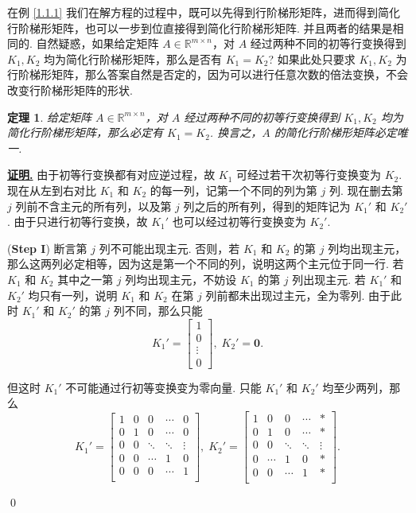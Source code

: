 \documentclass[10pt,openany]{article}
\theoremstyle{thmstyle} %
\newtheorem{theorem}{定理}[subsection]
\theoremstyle{defstyle} %
\theoremstyle{prostyle} %
\renewenvironment{proof}[1][证明]{\par\underline{\textbf{#1.}} \;\fangsong}{\qed\par}
\begin{document}
在例 \ref{1.1.1} 我们在解方程的过程中，既可以先得到行阶梯形矩阵，进而得到简化行阶梯形矩阵，也可以一步到位直接得到简化行阶梯形矩阵. 并且两者的结果是相同的. 自然疑惑，如果给定矩阵 \( A \in \mathbb{R}^{m \times n} \)，对 \( A \) 经过两种不同的初等行变换得到 \( K_1, K_2 \) 均为简化行阶梯形矩阵，那么是否有 \( K_1 = K_2 \)? 如果此处只要求 \( K_1, K_2 \) 为行阶梯形矩阵，那么答案自然是否定的，因为可以进行任意次数的倍法变换，不会改变行阶梯形矩阵的形状. 

\begin{theorem}
	给定矩阵 \( A \in \mathbb{R}^{m \times n} \)，对 \( A \) 经过两种不同的初等行变换得到 \( K_1, K_2 \) 均为简化行阶梯形矩阵，那么必定有 \( K_1=K_2 \). 换言之，\( A \) 的简化行阶梯形矩阵必定唯一. 
	\label{1.1.9}
\end{theorem}

\begin{proof}
	由于初等行变换都有对应逆过程，故 \( K_1 \) 可经过若干次初等行变换变为 \( K_2 \). 现在从左到右对比 \( K_1 \) 和 \( K_2 \) 的每一列，记第一个不同的列为第 \( j \) 列. 现在删去第 \( j \) 列前不含主元的所有列，以及第 \( j \) 列之后的所有列，得到的矩阵记为 \( K_1' \) 和 \( K_2' \). 由于只进行初等行变换，故 \( K_1' \) 也可以经过初等行变换变为 \( K_2' \).
	
	(\textbf{Step I}) 断言第 \( j \) 列不可能出现主元. 否则，若 \( K_1 \) 和 \( K_2 \) 的第 \( j \) 列均出现主元，那么这两列必定相等，因为这是第一个不同的列，说明这两个主元位于同一行. 若 \( K_1 \) 和 \( K_2 \) 其中之一第 \( j \) 列均出现主元，不妨设 \( K_1 \) 的第 \( j \) 列出现主元. 若 \( K_1' \) 和 \( K_2' \) 均只有一列，说明 \( K_1 \) 和 \( K_2 \) 在第 \( j \) 列前都未出现过主元，全为零列. 由于此时 \( K_1' \) 和 \( K_2' \) 的第 \( j \) 列不同，那么只能
	\[ K_1'= \begin{bmatrix}
		1 \\ 0 \\ \vdots \\ 0
	\end{bmatrix}, \; K_2'= \bm{0}. \]
	
	但这时 \( K_1' \) 不可能通过行初等变换变为零向量. 只能 \( K_1' \) 和 \( K_2' \) 均至少两列，那么
	\[ K_1'= \begin{bmatrix}
		1 & 0 & 0  & \cdots & 0 \\
		0 & 1 & 0 & \cdots & 0 \\
		0 & 0 & \ddots & \ddots & \vdots \\
		0 & 0 & \cdots & 1 & 0 \\
		0 & 0 & 0 & \cdots & 1 \\
		 &  &  &  & 
	\end{bmatrix}, \; K_2'=\begin{bmatrix}
	1 & 0 & 0  & \cdots & * \\
	0 & 1 & 0   & \cdots & * \\
	0 & 0 & \ddots & \ddots & \vdots \\
	0 &  \cdots & 1  & 0 & * \\
	0 & 0  & \cdots & 1 & * \\
	 &  &  &  &   
	\end{bmatrix}.  \]
	

\end{proof}
\end{document}
